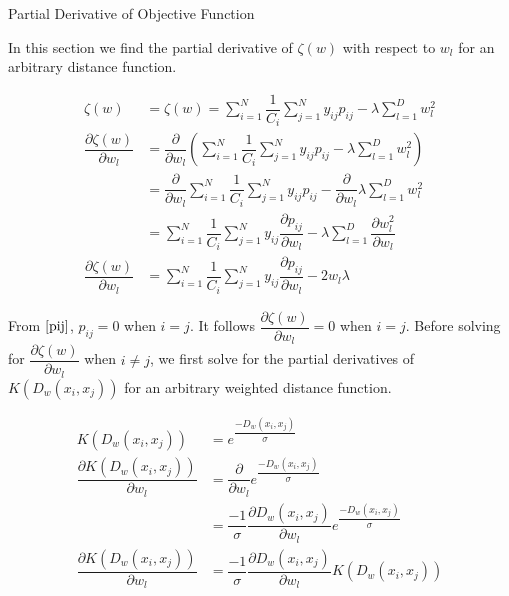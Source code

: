 \documentclass[12pt, a4paper]{article}
\begin{document}
\begin{section}{Partial Derivative of Objective Function}

    In this section we find the partial derivative of $\zeta(w)$ with respect
    to $w_l$ for an arbitrary distance function.

    \begin{align*}
        \zeta(w) &=
            \zeta (w) = \sum \limits_{i = 1}^N \dfrac{1}{C_i}
            \sum \limits_{j = 1}^N y_{ij} p_{ij}
            - \lambda \sum \limits_{l=1}^D w_l^2 \\
        \dfrac{\partial \zeta(w)}{\partial w_l} &=
            \dfrac{\partial}{\partial w_l} \left (
                \sum \limits_{i = 1}^N \dfrac{1}{C_i}
                \sum \limits_{j = 1}^N y_{ij} p_{ij}
                - \lambda \sum \limits_{l=1}^D w_l^2 \right )\\
        &= 
            \dfrac{\partial}{\partial w_l}
                \sum \limits_{i = 1}^N \dfrac{1}{C_i}
                \sum \limits_{j = 1}^N y_{ij} p_{ij}
            - \dfrac{\partial}{\partial w_l} 
                \lambda \sum \limits_{l=1}^D w_l^2 \\
        &=
            \sum \limits_{i = 1}^N \dfrac{1}{C_i}
            \sum \limits_{j = 1}^N y_{ij} \dfrac{\partial p_{ij}}{\partial w_l}
            - \lambda \sum \limits_{l=1}^D \dfrac{\partial w_l^2}{\partial w_l} \\
        \dfrac{\partial \zeta(w)}{\partial w_l} &=
            \sum \limits_{i = 1}^N \dfrac{1}{C_i}
            \sum \limits_{j = 1}^N y_{ij} \dfrac{\partial p_{ij}}{\partial w_l}
            - 2 w_l \lambda
    \end{align*}

    From $\eqref{pij}$, $p_{ij} = 0$ when $i = j$. It follows
    $\dfrac{\partial \zeta(w)}{\partial w_l} = 0$ when $i = j$. Before solving
    for $\dfrac{\partial \zeta(w)}{\partial w_l}$ when $i \neq j$, we first
    solve for the partial derivatives of $K\left (D_w(x_i, x_j) \right )$ for an
    arbitrary weighted distance function.

    \begin{align*}
        K\left (D_w(x_i, x_j) \right ) &= e^{\dfrac{-D_w(x_i, x_j)}{\sigma}} \\
        \dfrac{\partial K\left (D_w(x_i, x_j) \right )}{\partial w_l}
        &=
            \dfrac{\partial}{\partial w_l} e^{\dfrac{-D_w(x_i, x_j)}{\sigma}} \\
        &=  \dfrac{-1}{\sigma} \dfrac{\partial D_w(x_i, x_j)}{\partial w_l}
              e^{\dfrac{-D_w(x_i, x_j)}{\sigma}} \\
        \dfrac{\partial K\left (D_w(x_i, x_j) \right )}{\partial w_l}
        &=
            \dfrac{-1}{\sigma} \dfrac{\partial D_w(x_i, x_j)}{\partial w_l}
            K(D_w(x_i, x_j))
    \end{align*}


\end{section}
\end{document}
